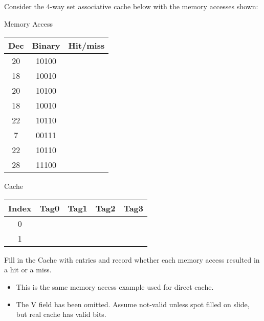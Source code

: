 \begin{frame}[fragile]
 \begin{tcolorbox}[enhanced,attach boxed title to top center={yshift=-3mm,yshifttext=-1mm},
  colback=red!5!white,colframe=red!75!black,colbacktitle=red!80!black,
  title=Try this,fonttitle=\bfseries,
  boxed title style={size=small,colframe=red!50!black} ]
Consider the 4-way set associative cache below with the memory
accesses shown:
{\footnotesize
\begin{multicols}{2}
    
\begin{center}
\hfill Memory Access\hfill~\medskip

\begin{tabular}{|c|c|c|}
\hline
Dec  & Binary  & Hit/miss \\
\hline
20 & 10100&\\
18 & 10010&\\
\hline
20 & 10100&\\
18 & 10010&\\
\hline
22 & 10110&\\
7 & 00111&\\
\hline
22 & 10110&\\
28 & 11100&\\
\hline
\end{tabular}
\end{center}

\columnbreak
\begin{center}
    
\hfill Cache\hfill~\medskip

\begin{tabular}{|c|c|c|c|c|}
\hline
Index & Tag0 & Tag1 & Tag2 & Tag3\\
\hline
0 & & & &\\
1 & & & &\\
\hline
\end{tabular}
\end{center}

\end{multicols}
}

Fill in the Cache with entries and record whether each memory access
resulted in a hit or a miss.
\end{tcolorbox}
\BNotes\ifnum{}
\begin{itemize}
\item This is the same memory access example used for direct cache.
\item The V field has been omitted.  Assume not-valid unless spot filled
	on slide, but real cache has valid bits.
\end{itemize}
\fi\ENotes
\end{frame}

